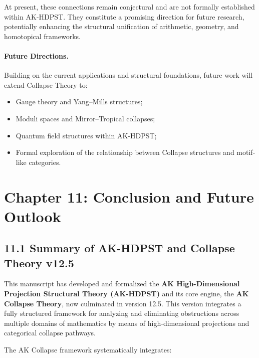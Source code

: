 \documentclass[11pt]{article}
\begin{document}
At present, these connections remain conjectural and are not formally established within AK-HDPST. They constitute a promising direction for future research, potentially enhancing the structural unification of arithmetic, geometry, and homotopical frameworks.

\paragraph{Future Directions.}

Building on the current applications and structural foundations, future work will extend Collapse Theory to:

\begin{itemize}
    \item Gauge theory and Yang–Mills structures;
    \item Moduli spaces and Mirror–Tropical collapses;
    \item Quantum field structures within AK-HDPST;
    \item Formal exploration of the relationship between Collapse structures and motif-like categories.
\end{itemize}




\section{Chapter 11: Conclusion and Future Outlook}

\subsection*{11.1 Summary of AK-HDPST and Collapse Theory v12.5}

This manuscript has developed and formalized the \textbf{AK High-Dimensional Projection Structural Theory (AK-HDPST)} and its core engine, the \textbf{AK Collapse Theory}, now culminated in version 12.5. This version integrates a fully structured framework for analyzing and eliminating obstructions across multiple domains of mathematics by means of high-dimensional projections and categorical collapse pathways.

The AK Collapse framework systematically integrates:
\end{document}
